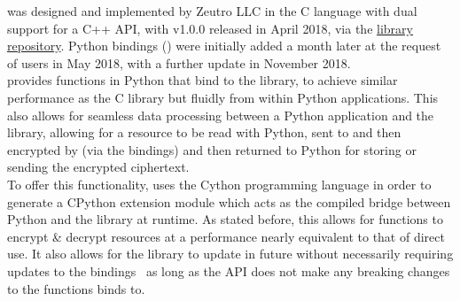 \OpenABE was designed and implemented by Zeutro LLC in the C language with dual support for a C++ API, with v1.0.0 released in April 2018, via the \href{https://github.com/zeutro/openabe/releases}{\OpenABE library repository}. Python bindings (\PyOpenABE) were initially added a month later at the request of users in May 2018, with a further update in November 2018.\\
\PyOpenABE provides functions in Python that bind to the \OpenABE library, to achieve similar performance as the C library but fluidly from within Python applications. This also allows for seamless data processing between a Python application and the \OpenABE library, allowing for a resource to be read with Python, sent to and then encrypted by \OpenABE (via the \PyOpenABE bindings) and then returned to Python for storing or sending the encrypted ciphertext.\\
To offer this functionality, \PyOpenABE uses the Cython programming language in order to generate a CPython extension module which acts as the compiled bridge between Python and the \OpenABE library at runtime. As stated before, this allows for \PyOpenABE functions to encrypt \& decrypt resources at a performance nearly equivalent to that of direct \OpenABE use. It also allows for the \OpenABE library to update in future without necessarily requiring updates to the \PyOpenABE bindings \textemdash\ as long as the \OpenABE API does not make any breaking changes to the functions \PyOpenABE binds to.
